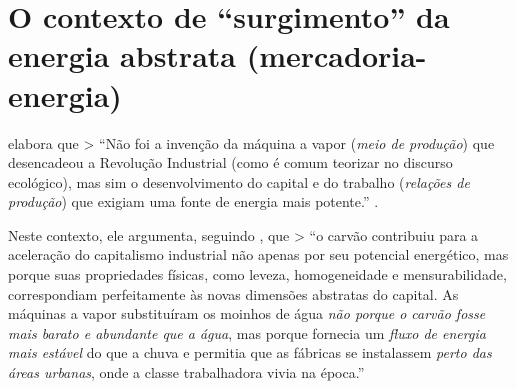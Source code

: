 \hypertarget{o-contexto-de-surgimento-da-energia-abstrata-mercadoria-energia}{%
\section{O contexto de ``surgimento'' da energia abstrata (mercadoria-energia)}\label{o-contexto-de-surgimento-da-energia-abstrata-mercadoria-energia}}

\textcite{Pasquinelli2023} elabora que \textgreater{} ``Não foi a invenção da máquina a vapor (\textit{meio de produção}) que desencadeou a Revolução Industrial (como é comum teorizar no discurso ecológico), mas sim o desenvolvimento do capital e do trabalho (\textit{relações de produção}) que exigiam uma fonte de energia mais potente.'' \parencite[, p. 107]{Pasquinelli2023}.

Neste contexto, ele argumenta, seguindo \textcite{Malm2016}, que \textgreater{} ``o carvão contribuiu para a aceleração do capitalismo industrial não apenas por seu potencial energético, mas porque suas propriedades físicas, como leveza, homogeneidade e mensurabilidade, correspondiam perfeitamente às novas dimensões abstratas do capital. As máquinas a vapor substituíram os moinhos de água \textit{não porque o carvão fosse mais barato e abundante que a água}, mas porque fornecia um \textit{fluxo de energia mais estável} do que a chuva e permitia que as fábricas se instalassem \textit{perto das áreas urbanas}, onde a classe trabalhadora vivia na época.'' \parencite[, p. 122-3, grifo meu]{Pasquinelli2023}

